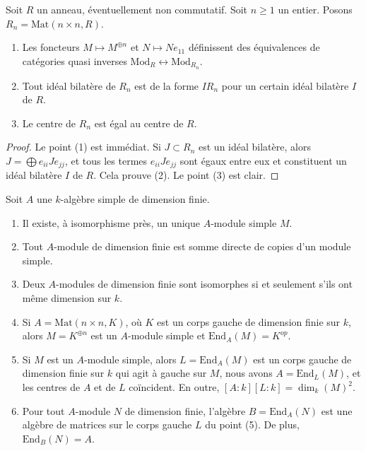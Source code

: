 \begin{lemma}
\label{lemma-matrix-algebras}
Soit $R$ un anneau, éventuellement non commutatif. Soit $n \geq 1$ un entier.
Posons $R_n = \text{Mat}(n \times n, R)$.
\begin{enumerate}
\item Les foncteurs $M \mapsto M^{\oplus n}$ et
$N \mapsto Ne_{11}$ définissent des équivalences de catégories quasi inverses
$\text{Mod}_R \leftrightarrow \text{Mod}_{R_n}$.
\item Tout idéal bilatère de $R_n$ est de la forme $IR_n$ pour un certain
idéal bilatère $I$ de $R$.
\item Le centre de $R_n$ est égal au centre de $R$.
\end{enumerate}
\end{lemma}

\begin{proof}
Le point (1) est immédiat. Si $J \subset R_n$ est un idéal bilatère, alors
$J = \bigoplus e_{ii}Je_{jj}$, et tous les termes $e_{ii}Je_{jj}$ sont
égaux entre eux et constituent un idéal bilatère $I$ de $R$. Cela prouve (2).
Le point (3) est clair.
\end{proof}

\begin{lemma}
\label{lemma-simple-module-unique}
Soit $A$ une $k$-algèbre simple de dimension finie.
\begin{enumerate}
\item Il existe, à isomorphisme près, un unique $A$-module simple $M$.
\item Tout $A$-module de dimension finie est somme directe de copies
d'un module simple.
\item Deux $A$-modules de dimension finie sont isomorphes si et
seulement s'ils ont même dimension sur $k$.
\item Si $A = \text{Mat}(n \times n, K)$, où $K$ est un corps gauche de
dimension finie sur $k$, alors $M = K^{\oplus n}$ est un $A$-module simple et
$\text{End}_A(M) = K^{op}$.
\item Si $M$ est un $A$-module simple, alors $L = \text{End}_A(M)$ est un
corps gauche de dimension finie sur $k$ qui agit à gauche sur $M$, nous avons
$A = \text{End}_L(M)$, et les centres de $A$ et de $L$ coïncident.
En outre, $[A : k] [L : k] = \dim_k(M)^2$.
\item Pour tout $A$-module $N$ de dimension finie, l'algèbre
$B = \text{End}_A(N)$ est une algèbre de matrices sur le corps gauche $L$ du
point (5). De plus, $\text{End}_B(N) = A$.
\end{enumerate}
\end{lemma}

